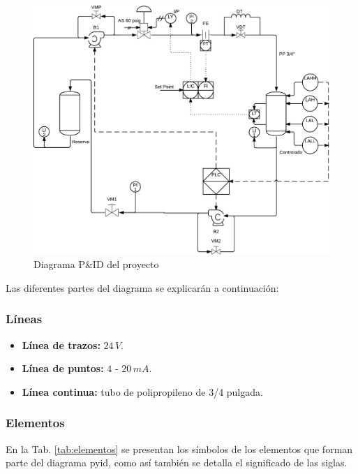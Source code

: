 \begin{figure}
	\centering
\includegraphics[width=\textwidth]{Cap2-DisenoEnsamblado/images/p&id.pdf}
	\caption{Diagrama P\&ID del proyecto}
	\label{img:pyid}
\end{figure}

Las diferentes partes del diagrama se explicarán a continuación:

\subsubsection{Líneas}

\begin{itemize}
 \item \textbf{Línea de trazos:} $24\,V$.
 \item \textbf{Línea de puntos:} $4$ - $20\,mA$.
 \item \textbf{Línea continua:} tubo de polipropileno de 3/4 pulgada.
\end{itemize}

\subsubsection{Elementos}

En la Tab. \ref{tab:elementos} se presentan los símbolos de
los elementos que forman parte del diagrama \gls{pyid}, como así
también se detalla el significado de las siglas.

